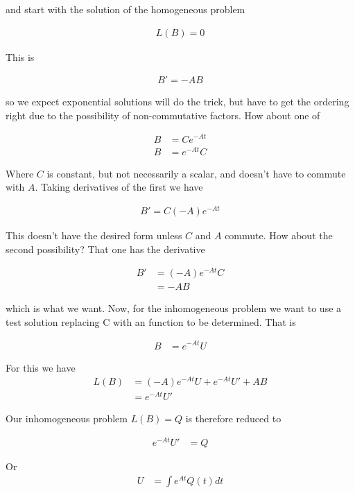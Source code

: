 and start with the solution of the 
homogeneous problem

\begin{align*}
L(B) = 0
\end{align*}

This is 

\begin{align*}
B' = -A B
\end{align*}

so we expect exponential solutions will do the trick, but have to get the ordering right due to the possibility of non-commutative factors.  How about one of

\begin{align*}
B &= C e^{-At} \\
B &= e^{-At} C
\end{align*}

Where $C$ is constant, but not necessarily a scalar, and doesn't have to commute with $A$.  Taking derivatives of the first we have

\begin{align*}
B' = C (-A) e^{-At}
\end{align*}

This doesn't have the desired form unless $C$ and $A$ commute.  How about the second possibility?  That one has the derivative

\begin{align*}
B' 
&= (-A) e^{-At} C \\
&= -A B 
\end{align*}

which is what we want.  Now, for the inhomogeneous problem we want to use a test solution replacing C with an function to be determined.  That is

\begin{align*}
B &= e^{-At} U
\end{align*}

For this we have
\begin{align*}
L(B) 
&= (-A) e^{-At} U + e^{-At} U' + A B  \\
&= e^{-At} U'
\end{align*}

Our inhomogeneous problem $L(B) = Q$ is therefore reduced to

\begin{align*}
e^{-At} U' &= Q
\end{align*}

Or 
\begin{align*}
U &= \int e^{A t} Q(t) dt
\end{align*}

